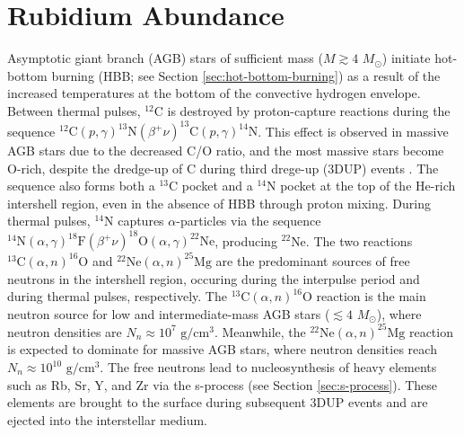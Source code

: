 \section{Rubidium Abundance} \label{sec:Rb_Abundance}






Asymptotic giant branch (AGB) stars of sufficient mass ($M \gtrsim 4$ $M_{\odot}$) initiate hot-bottom burning (HBB; see Section \ref{sec:hot-bottom-burning}) as a result of the increased temperatures at the bottom of the convective hydrogen envelope. Between thermal pulses, $^{12}$C is destroyed by proton-capture reactions during the sequence $^{12}\mathrm{C}(p,\gamma)^{13}\mathrm{N}(\beta^{+}\nu)^{13}\mathrm{C}(p,\gamma)^{14}\mathrm{N}$. This effect is observed in massive AGB stars due to the decreased C/O ratio, and the most massive stars become O-rich, despite the dredge-up of C during third drege-up (3DUP) events \cite{Garcia2006}. The sequence also forms both a $^{13}$C pocket and a $^{14}$N pocket at the top of the He-rich intershell region, even in the absence of HBB through proton mixing. During thermal pulses, $^{14}$N captures $\alpha$-particles via the sequence $^{14}\mathrm{N}(\alpha,\gamma)^{18}\mathrm{F}(\beta^{+}\nu)^{18}\mathrm{O}(\alpha,\gamma)^{22}\mathrm{Ne}$, producing $^{22}$Ne. The two reactions $^{13}\mathrm{C}(\alpha,n)^{16}\mathrm{O}$ and $^{22}\mathrm{Ne}(\alpha,n)^{25}\mathrm{Mg}$ are the predominant sources of free neutrons in the intershell region, occuring during the interpulse period and during thermal pulses, respectively. The $^{13}\mathrm{C}(\alpha,n)^{16}\mathrm{O}$ reaction is the main neutron source for low and intermediate-mass AGB stars ($\lesssim 4$ $M_{\odot}$), where neutron densities are $N_{n} \approx 10^{7}$ $\mathrm{g}/\mathrm{cm}^{3}$. Meanwhile, the $^{22}\mathrm{Ne}(\alpha,n)^{25}\mathrm{Mg}$ reaction is expected to dominate for massive AGB stars, where neutron densities reach $N_{n} \approx 10^{10}$ $\mathrm{g}/\mathrm{cm}^{3}$. The free neutrons lead to nucleosynthesis of heavy elements such as Rb, Sr, Y, and Zr via the s-process (see Section \ref{sec:s-process}). These elements are brought to the surface during subsequent 3DUP events and are ejected into the interstellar medium. 

